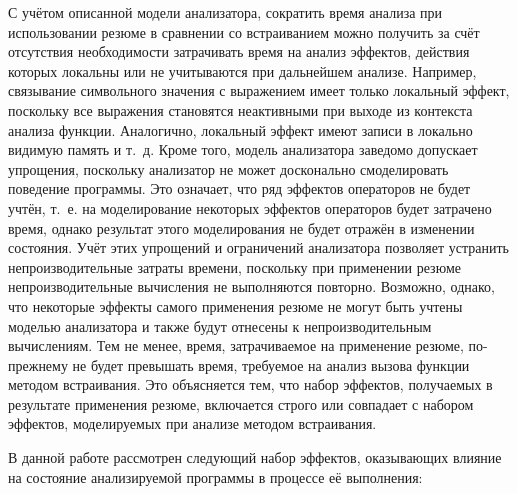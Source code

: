 С учётом описанной модели анализатора, сократить время анализа при использовании резюме в сравнении со встраиванием можно получить за счёт отсутствия необходимости затрачивать время на анализ эффектов, действия которых локальны или не учитываются при дальнейшем анализе. Например, связывание символьного значения с выражением имеет только локальный эффект, поскольку все выражения становятся неактивными при выходе из контекста анализа функции. Аналогично, локальный эффект имеют записи в локально видимую память и т.~д. Кроме того, модель анализатора заведомо допускает упрощения, поскольку анализатор не может досконально смоделировать поведение программы. Это означает, что ряд эффектов операторов не будет учтён, т.~е. на моделирование некоторых эффектов операторов будет затрачено время, однако результат этого моделирования не будет отражён в изменении состояния. Учёт этих упрощений и ограничений анализатора позволяет устранить непроизводительные затраты времени, поскольку при применении резюме непроизводительные вычисления не выполняются повторно. Возможно, однако, что некоторые эффекты самого применения резюме не могут быть учтены моделью анализатора и также будут отнесены к непроизводительным вычислениям. Тем не менее, время, затрачиваемое на применение резюме, по-прежнему не будет превышать время, требуемое на анализ вызова функции методом встраивания. Это объясняется тем, что набор эффектов, получаемых в результате применения резюме, включается строго или совпадает с набором эффектов, моделируемых при анализе методом встраивания.

В данной работе рассмотрен следующий набор эффектов, оказывающих влияние на состояние анализируемой программы в процессе её выполнения:

